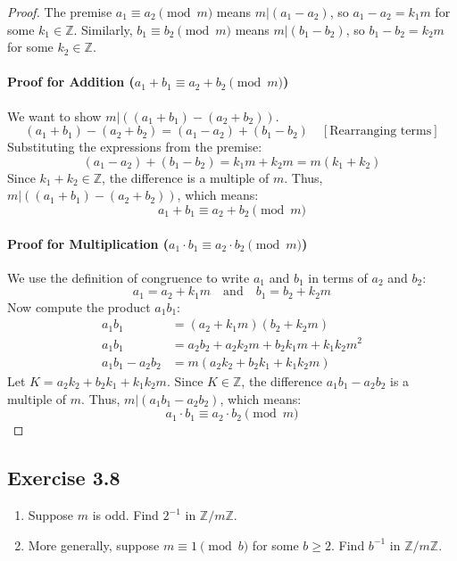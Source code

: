 \begin{proof}
The premise $a_1 \equiv a_2 \pmod{m}$ means $m | (a_1 - a_2)$, so $a_1 - a_2 = k_1 m$ for some $k_1 \in \mathbb{Z}$.
Similarly, $b_1 \equiv b_2 \pmod{m}$ means $m | (b_1 - b_2)$, so $b_1 - b_2 = k_2 m$ for some $k_2 \in \mathbb{Z}$.

\paragraph{Proof for Addition ($a_1+b_1 \equiv a_2+b_2 \pmod{m}$)}
We want to show $m | ((a_1+b_1) - (a_2+b_2))$.
$$ (a_1+b_1) - (a_2+b_2) = (a_1 - a_2) + (b_1 - b_2) \quad [\text{Rearranging terms}] $$
Substituting the expressions from the premise:
$$ (a_1 - a_2) + (b_1 - b_2) = k_1 m + k_2 m = m(k_1 + k_2) $$
Since $k_1+k_2 \in \mathbb{Z}$, the difference is a multiple of $m$.
Thus, $m | ((a_1+b_1) - (a_2+b_2))$, which means:
$$ a_1+b_1 \equiv a_2+b_2 \pmod{m} $$

\paragraph{Proof for Multiplication ($a_1 \cdot b_1 \equiv a_2 \cdot b_2 \pmod{m}$)}
We use the definition of congruence to write $a_1$ and $b_1$ in terms of $a_2$ and $b_2$:
$$ a_1 = a_2 + k_1 m \quad \text{and} \quad b_1 = b_2 + k_2 m $$
Now compute the product $a_1 b_1$:
\begin{align*}
    a_1 b_1 &= (a_2 + k_1 m)(b_2 + k_2 m) \\
    a_1 b_1 &= a_2 b_2 + a_2 k_2 m + b_2 k_1 m + k_1 k_2 m^2 \\
    a_1 b_1 - a_2 b_2 &= m(a_2 k_2 + b_2 k_1 + k_1 k_2 m)
\end{align*}
Let $K = a_2 k_2 + b_2 k_1 + k_1 k_2 m$. Since $K \in \mathbb{Z}$, the difference $a_1 b_1 - a_2 b_2$ is a multiple of $m$.
Thus, $m | (a_1 b_1 - a_2 b_2)$, which means:
$$ a_1 \cdot b_1 \equiv a_2 \cdot b_2 \pmod{m} $$
\end{proof}
\newpage
\subsection*{Exercise 3.8}
\begin{enumerate}
    \item Suppose $m$ is odd. Find $2^{-1}$ in $\mathbb{Z}/m\mathbb{Z}$.
    \item More generally, suppose $m \equiv 1 \pmod{b}$ for some $b \ge 2$. Find $b^{-1}$ in $\mathbb{Z}/m\mathbb{Z}$.
\end{enumerate}

